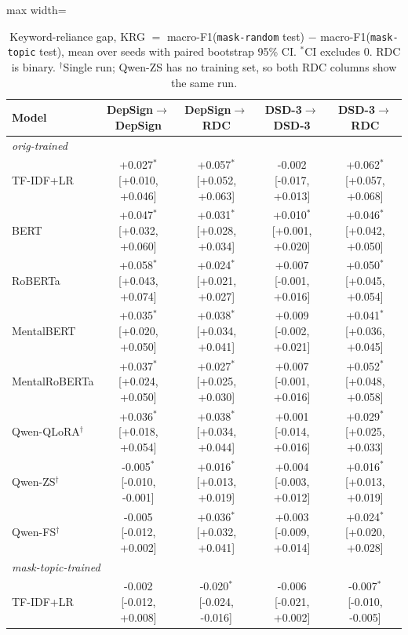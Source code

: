 \begin{table}[t]
\centering
\caption{Keyword-reliance gap, KRG $=$ macro-F1(\texttt{mask-random} test) $-$ macro-F1(\texttt{mask-topic} test), mean over seeds with paired bootstrap 95\% CI. $^{*}$CI excludes 0. RDC is binary. $^{\dagger}$Single run; Qwen-ZS has no training set, so both RDC columns show the same run.}\label{tab:krg}
\scriptsize
\setlength{\tabcolsep}{3pt}
\begin{adjustbox}{max width=\textwidth}
\begin{tabular}{lcccc}
\toprule
Model & DepSign$\to$DepSign & DepSign$\to$RDC & DSD-3$\to$DSD-3 & DSD-3$\to$RDC \\
\midrule
\multicolumn{5}{l}{\textit{orig-trained}} \\
TF-IDF+LR & +0.027$^{*}$ \tiny[+0.010, +0.046] & +0.057$^{*}$ \tiny[+0.052, +0.063] & -0.002 \tiny[-0.017, +0.013] & +0.062$^{*}$ \tiny[+0.057, +0.068] \\
BERT & +0.047$^{*}$ \tiny[+0.032, +0.060] & +0.031$^{*}$ \tiny[+0.028, +0.034] & +0.010$^{*}$ \tiny[+0.001, +0.020] & +0.046$^{*}$ \tiny[+0.042, +0.050] \\
RoBERTa & +0.058$^{*}$ \tiny[+0.043, +0.074] & +0.024$^{*}$ \tiny[+0.021, +0.027] & +0.007 \tiny[-0.001, +0.016] & +0.050$^{*}$ \tiny[+0.045, +0.054] \\
MentalBERT & +0.035$^{*}$ \tiny[+0.020, +0.050] & +0.038$^{*}$ \tiny[+0.034, +0.041] & +0.009 \tiny[-0.002, +0.021] & +0.041$^{*}$ \tiny[+0.036, +0.045] \\
MentalRoBERTa & +0.037$^{*}$ \tiny[+0.024, +0.050] & +0.027$^{*}$ \tiny[+0.025, +0.030] & +0.007 \tiny[-0.001, +0.016] & +0.052$^{*}$ \tiny[+0.048, +0.058] \\
Qwen-QLoRA$^{\dagger}$ & +0.036$^{*}$ \tiny[+0.018, +0.054] & +0.038$^{*}$ \tiny[+0.034, +0.044] & +0.001 \tiny[-0.014, +0.016] & +0.029$^{*}$ \tiny[+0.025, +0.033] \\
Qwen-ZS$^{\dagger}$ & -0.005$^{*}$ \tiny[-0.010, -0.001] & +0.016$^{*}$ \tiny[+0.013, +0.019] & +0.004 \tiny[-0.003, +0.012] & +0.016$^{*}$ \tiny[+0.013, +0.019] \\
Qwen-FS$^{\dagger}$ & -0.005 \tiny[-0.012, +0.002] & +0.036$^{*}$ \tiny[+0.032, +0.041] & +0.003 \tiny[-0.009, +0.014] & +0.024$^{*}$ \tiny[+0.020, +0.028] \\
\midrule
\multicolumn{5}{l}{\textit{mask-topic-trained}} \\
TF-IDF+LR & -0.002 \tiny[-0.012, +0.008] & -0.020$^{*}$ \tiny[-0.024, -0.016] & -0.006 \tiny[-0.021, +0.002] & -0.007$^{*}$ \tiny[-0.010, -0.005] \\

\end{tabular}
\end{adjustbox}
\end{table}
